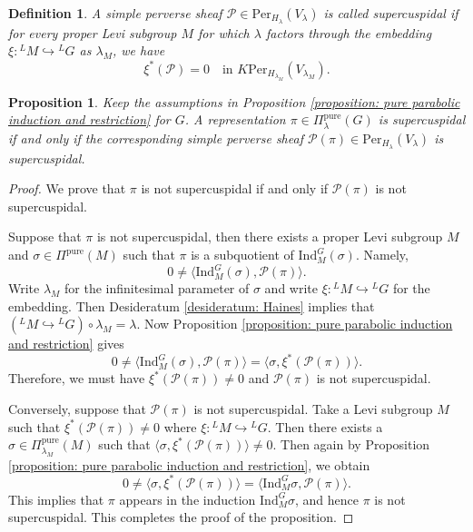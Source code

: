 \documentclass[11pt,letterpaper]{amsart}
\newcommand{\pure}{\mathrm{pure}}
\newcommand{\Ind}{\mathrm{Ind}}
\newcommand{\Per}{\mathrm{Per}}
\newtheorem{prop}[thm]{Proposition}
\newtheorem{defn}[thm]{Definition}
\renewcommand{\1}{\mathbbm{1}}
\numberwithin{equation}{section}
\begin{document}
{\begin{defn}\label{def sc sheaf}
A simple perverse sheaf $\mathcal{P} \in \Per_{H_\lambda}(V_\lambda)$ is called  \emph{supercuspidal} if for every proper Levi subgroup $M$ for which $\lambda$ factors through the embedding $\xi: {}^L M \hookrightarrow {}^L G$ as $\lambda_M$, we have
\begin{equation}\label{equation: supercuspidal sheaf condition}
    \xi^*(\mathcal{P})=0 \quad \text{in } K\Per_{H_{\lambda_M}}(V_{\lambda_M}).
\end{equation}
\end{defn}

\begin{prop}
    Keep the assumptions in Proposition \ref{proposition: pure parabolic induction and restriction} for $G$. A representation $\pi \in \Pi_{\lambda}^{\pure}(G)$ is supercuspidal if and only if the corresponding simple perverse sheaf $\mathcal{P}(\pi)\in \Per_{H_\lambda}(V_\lambda)$ is supercuspidal.
\end{prop}
\begin{proof}
    We prove that $\pi$ is not supercuspidal if and only if $\mathcal{P}(\pi)$ is not supercuspidal.

    Suppose that $\pi$ is not supercuspidal, then there exists a proper Levi subgroup $M$ and $\sigma \in \Pi^{\pure}(M)$ such that $\pi$ is a subquotient of $\Ind_M^G(\sigma)$.  Namely, 
    \[0 \neq \langle \Ind_M^G(\sigma), \mathcal{P}(\pi) \rangle.\]
    Write $\lambda_M$ for the infinitesimal parameter of $\sigma$ and write $\xi: {}^LM \hookrightarrow {}^L G$ for the embedding. Then Desideratum \ref{desideratum: Haines} implies that $({}^L M \hookrightarrow {}^L G) \circ \lambda_M= \lambda$. Now Proposition \ref{proposition: pure parabolic induction and restriction} gives
    \[  0 \neq \langle \Ind_M^G(\sigma), \mathcal{P}(\pi) \rangle=  \langle \sigma, \xi^{\ast}(\mathcal{P}(\pi)) \rangle. \]
    Therefore, we must have $ \xi^{\ast}(\mathcal{P}(\pi))\neq 0$ and $\mathcal{P}(\pi)$ is not supercuspidal.

    Conversely, suppose that $\mathcal{P}(\pi)$ is not supercuspidal. Take a Levi subgroup $M$ such that $\xi^{\ast} (\mathcal{P}(\pi)) \neq 0$ where $\xi:{}^L M \hookrightarrow {}^L G$. Then there exists a $\sigma \in \Pi_{\lambda_M}^{\pure}(M)$ such that $\langle \sigma ,\xi^{\ast} (\mathcal{P}(\pi))  \rangle \neq 0 $. Then again by Proposition \ref{proposition: pure parabolic induction and restriction}, we obtain
    \[ 0 \neq \langle \sigma ,\xi^{\ast} (\mathcal{P}(\pi))\rangle = \langle \Ind_M^G \sigma , \mathcal{P}(\pi) \rangle. \]
    This implies that $\pi$ appears in the induction $\Ind_M^G \sigma$, and hence $\pi$ is not supercuspidal. This completes the proof of the proposition.
\end{proof}

}
\end{document}

